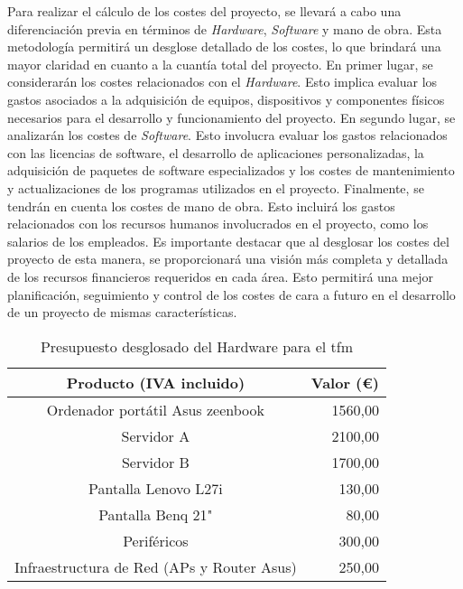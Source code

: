 Para realizar el cálculo de los costes del proyecto, se llevará a cabo una diferenciación previa en términos de \textit{Hardware}, \textit{Software} y mano de obra. Esta metodología permitirá un desglose detallado de los costes, lo que brindará una mayor claridad en cuanto a la cuantía total del proyecto.  En primer lugar, se considerarán los costes relacionados con el \textit{Hardware}. Esto implica evaluar los gastos asociados a la adquisición de equipos, dispositivos y componentes físicos necesarios para el desarrollo y funcionamiento del proyecto. En segundo lugar, se analizarán los costes de \textit{Software}. Esto involucra evaluar los gastos relacionados con las licencias de software, el desarrollo de aplicaciones personalizadas, la adquisición de paquetes de software especializados y los costes de mantenimiento y actualizaciones de los programas utilizados en el proyecto. Finalmente, se tendrán en cuenta los costes de mano de obra. Esto incluirá los gastos relacionados con los recursos humanos involucrados en el proyecto, como los salarios de los empleados. Es importante destacar que al desglosar los costes del proyecto de esta manera, se proporcionará una visión más completa y detallada de los recursos financieros requeridos en cada área. Esto permitirá una mejor planificación, seguimiento y control de los costes de cara a futuro en el desarrollo de un proyecto de mismas características.

\begin{table}[ht]
	\centering
	\begin{tabular}{|c|r|}
		\hline
		\rowcolor[HTML]{EFEFEF}
		\textbf{Producto (IVA incluido)}           & \multicolumn{1}{c|}{\cellcolor[HTML]{EFEFEF}\textbf{Valor (€)}} \\ \hline
		Ordenador portátil Asus zeenbook           & 1560,00                                                         \\ \hline
		Servidor  A                                & 2100,00                                                         \\ \hline
		Servidor  B                                & 1700,00                                                         \\ \hline
		Pantalla Lenovo L27i                       & 130,00                                                          \\ \hline
		Pantalla Benq 21"                          & 80,00                                                           \\ \hline
		Periféricos                                & 300,00                                                          \\ \hline
		Infraestructura de Red (APs y Router Asus) & 250,00                                                          \\ \hline
	\end{tabular}
	\caption{Presupuesto desglosado del Hardware para el \gls{tfm}}
	\label{tab:costesHardware}
\end{table}


